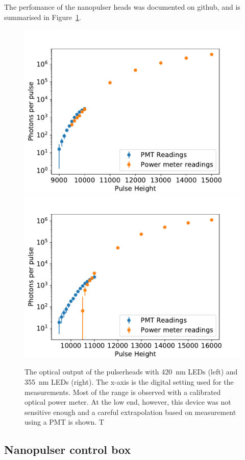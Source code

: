 The perfomance of the nanopulser heads was documented on github\cite{GITHUB_TEST}, and is summarised in Figure~\ref{figure:pulserhead_output}.

\begin{figure}
\begin{center}	
  \includegraphics[width=0.48\linewidth]{figures/PhotonCounts420nm.pdf}
  \includegraphics[width=0.48\linewidth]{figures/PhotonCounts355nm.pdf}
  \caption{The optical output of the pulserheads with 420~nm LEDs (left) and 355~nm LEDs (right). The x-axis is the digital setting used for the measurements. Most of the range is observed with a calibrated optical power meter. At the low end, however, this device was not sensitive enough and a careful extrapolation based on measurement using a PMT is shown. T}
  \label{figure:pulserhead_output}
\end{center}
\end{figure}



\subsection*{Nanopulser control box}

